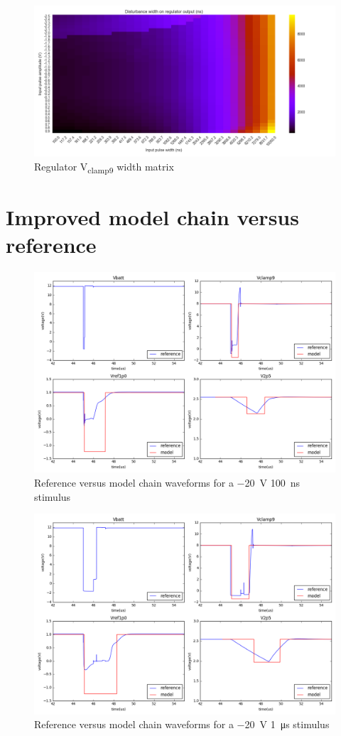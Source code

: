 \begin{figure}[!h]
  \centering
  \includegraphics[width=\textwidth]{src/4/figures/regulator_cz_v2_width.png}
  \caption{Regulator V\textsubscript{clamp9} width matrix}
  \label{fig:regu_width}
\end{figure}

\section{Improved model chain versus reference}
\label{apx:block-model-comparison}

\begin{figure}[!h]
  \centering
  \includegraphics[width=\textwidth]{src/4/figures/total_simulation_20V_100n_V2.png}
  \caption{Reference versus model chain waveforms for a \SI{-20}{\volt} \SI{100}{\nano\second} stimulus}
  \label{fig:reference_simu_v2_20V_100n}
\end{figure}


\begin{figure}[!h]
  \centering
  \includegraphics[width=\textwidth]{src/4/figures/total_simulation_20V_1u_V2.png}
  \caption{Reference versus model chain waveforms for a \SI{-20}{\volt} \SI{1}{\micro\second} stimulus}
  \label{fig:reference_simu_v2_20V_100n}
\end{figure}

